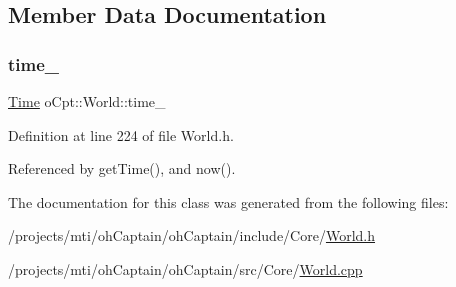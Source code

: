 \subsection{Member Data Documentation}
\hypertarget{classo_cpt_1_1_world_a2f93632f34dd13d0a61eec6d8d2879ff}{}\label{classo_cpt_1_1_world_a2f93632f34dd13d0a61eec6d8d2879ff} 
\subsubsection{\texorpdfstring{time\+\_\+}{time\_}}
{\footnotesize\ttfamily \hyperlink{classo_cpt_1_1_world_1_1_time}{Time} o\+Cpt\+::\+World\+::time\+\_\+\hspace{0.3cm}{\ttfamily [protected]}}



Definition at line 224 of file World.\+h.



Referenced by get\+Time(), and now().



The documentation for this class was generated from the following files\+:\begin{DoxyCompactItemize}
\item 
/projects/mti/oh\+Captain/oh\+Captain/include/\+Core/\hyperlink{_world_8h}{World.\+h}\item 
/projects/mti/oh\+Captain/oh\+Captain/src/\+Core/\hyperlink{_world_8cpp}{World.\+cpp}\end{DoxyCompactItemize}
